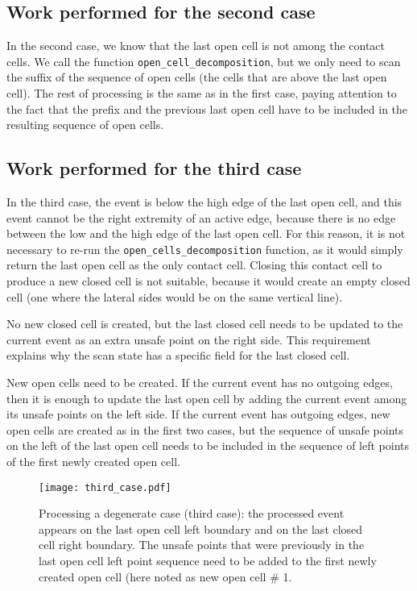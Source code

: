 \documentclass[a4paper, USenglish, cleveref, autoref, thm-restate, final]{lipics-v2021}
\begin{document}
\subsection{Work performed for the second case}
In the second case, we know that the last open cell is not among the
contact cells.  We call the function {\tt open\_cell\_decomposition},
but we only need to scan the suffix of the sequence of open cells (the
cells that are above the last open cell).  The rest of processing is
the same as in the first case, paying attention to the fact that the
prefix and the previous last open cell have to be included in the
resulting sequence of open cells.

\subsection{Work performed for the third case}
In the third case, the event is below the high edge of the last open
cell, and this event cannot be the right extremity of
an active edge, because there is no edge between the low and the high
edge of the last open cell.  For this reason, it is not necessary to
re-run the {\tt open\_cells\_decomposition} function, as it would
simply return the last open cell as the only contact cell.
Closing this contact cell to produce a new closed
cell is not suitable, because it would create an empty closed cell
(one where the lateral sides would be on the same vertical line).

No new closed cell is created, but the last closed cell needs to be
updated to the current event as an extra unsafe point on the right side.
This requirement explains why the scan state has a specific field for
the last closed cell.

New open cells need to be created.  If the current event has no
outgoing edges, then it is enough to update the last open cell by adding
the current event among its unsafe points on the left side.  If the
current event has outgoing edges, new open cells are created as in the
first two cases, but the sequence of unsafe points on the left of
the last open cell needs to be included in the sequence of left
points of the first newly created open cell.
\begin{figure}
\begin{center}
\texttt{[image: third\_case.pdf]}
\end{center}
\caption{Processing a degenerate case (third case):
  the processed event appears on
  the last open cell left boundary and on the last closed cell right
  boundary.  The unsafe points that were previously in the last open
  cell left point sequence need to be added to the first newly created
  open cell (here noted as {\sf new open cell \# 1}.
  }
\label{fig:third_case_degenerate}
\end{figure}
\end{document}
